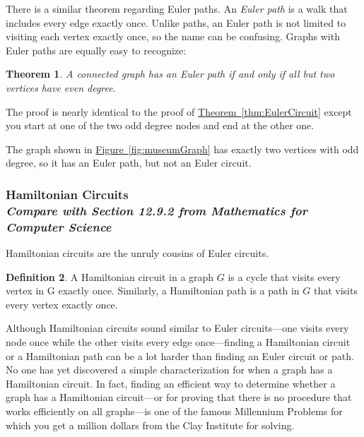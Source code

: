 \documentclass[11pt,oneside]{book}
\newtheorem{thm}{Theorem}[section]
\theoremstyle{definition}
\newtheorem{defn}[thm]{Definition}
\begin{document}
There is a similar theorem regarding Euler paths.
An \emph{Euler path} is a walk that includes every edge exactly once.
Unlike paths, an Euler path is not limited to visiting each vertex exactly once, so the name can be confusing.
Graphs with Euler paths are equally easy to recognize:

\begin{thm} \label{thm:EulerPath}
  A connected graph has an Euler path if and only if all but two vertices have even degree.
\end{thm}

The proof is nearly identical to the proof of \hyperref[thm:EulerCircuit]{Theorem~\ref*{thm:EulerCircuit}} except you start at one of the two odd degree nodes and end at the other one.

The graph shown in \hyperref[fig:museumGraph]{Figure~\ref*{fig:museumGraph}} has exactly two vertices with odd degree, so it has an Euler path, but not an Euler circuit.

\subsubsection[Hamiltonian Circuits]{Hamiltonian Circuits\\[0.5ex]
\normalsize\normalfont\textit{
    Compare with Section 12.9.2 from \emph{Mathematics for Computer Science}
}}
Hamiltonian circuits are the unruly cousins of Euler circuits.

\begin{defn}
  A Hamiltonian circuit in a graph $G$ is a cycle that visits every vertex in G exactly once.
  Similarly, a Hamiltonian path is a path in $G$ that visits every vertex exactly once.
\end{defn}

Although Hamiltonian circuits sound similar to Euler circuits---one visits every node once while the other visits every edge once---finding a Hamiltonian circuit or a Hamiltonian path can be a lot harder than finding an Euler circuit or path.
No one has yet discovered a simple characterization for when a graph has a Hamiltonian circuit.
In fact, finding an efficient way to determine whether a graph has a Hamiltonian circuit---or for proving that there is no procedure that works efficiently on all graphs---is one of the famous Millennium Problems for which you get a million dollars from the Clay Institute for solving.
\end{document}
